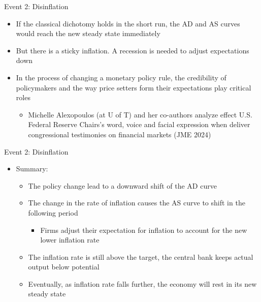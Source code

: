 \documentclass[aspectratio=1610]{beamer}
\begin{document}
\begin{frame}[wide]{Event 2: Disinflation }
	\begin{itemize}
		\item If the classical dichotomy holds in the short run, the AD and AS curves would reach the new steady state immediately
		\vspace{6mm}
		\item But there is a sticky inflation. A recession is needed to adjust expectations down
		\vspace{6mm}
		\item In the process of changing a monetary policy rule, the credibility of policymakers and the way price setters form their expectations play critical roles
		\vspace{3mm}
		\begin{itemize}
			\item Michelle Alexopoulos (at U of T) and her co-authors analyze effect U.S. Federal Reserve Chairs's word, voice and facial expression when deliver congressional testimonies  on financial markets (JME 2024)
		\end{itemize}
	\end{itemize}
\end{frame}

\begin{frame}[wide]{Event 2: Disinflation }
	\begin{itemize}
		\item Summary:
		\vspace{2mm}
		\begin{itemize}
			\item The policy change lead to a downward shift of the AD curve
			\vspace{2mm}
			\item The change in the rate of inflation causes the AS curve to shift in the following period
			\vspace{2mm}
			\begin{itemize}
				\item Firms adjust their expectation for inflation to account for the new lower inflation rate
			\end{itemize}
			\vspace{2mm}
			\item The inflation rate is still above the target, the central bank keeps actual output below potential
			\vspace{2mm}
			\item Eventually, as inflation rate falls further, the economy will rest in its new steady state
		\end{itemize}
	\end{itemize}
\end{frame}
\end{document}
